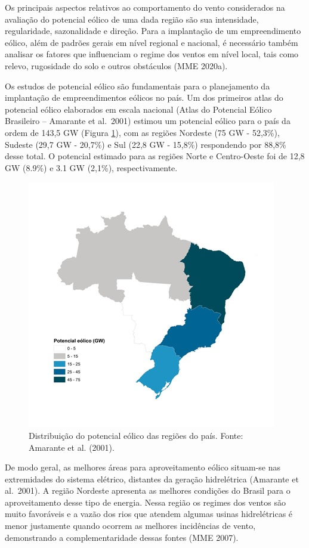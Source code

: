 \documentclass[
  oneside]{scrbook}
\begin{document}
Os principais aspectos relativos ao comportamento do vento considerados na avaliação do potencial eólico de uma dada região são sua intensidade, regularidade, sazonalidade e direção. Para a implantação de um empreendimento eólico, além de padrões gerais em nível regional e nacional, é necessário também analisar os fatores que influenciam o regime dos ventos em nível local, tais como relevo, rugosidade do solo e outros obstáculos (MME 2020a).

Os estudos de potencial eólico são fundamentais para o planejamento da implantação de empreendimentos eólicos no país. Um dos primeiros atlas do potencial eólico elaborados em escala nacional (Atlas do Potencial Eólico Brasileiro -- Amarante et al.~2001) estimou um potencial eólico para o país da ordem de 143,5 GW (Figura \ref{fig:02}), com as regiões Nordeste (75 GW - 52,3\%), Sudeste (29,7 GW - 20,7\%) e Sul (22,8 GW - 15,8\%) respondendo por 88,8\% desse total. O potencial estimado para as regiões Norte e Centro-Oeste foi de 12,8 GW (8.9\%) e 3.1 GW (2,1\%), respectivamente.

\begin{figure}[H]

{\centering \includegraphics[width=0.55\linewidth]{imagens/cap01/Figura_1.2} 

}

\caption{Distribuição do potencial eólico das regiões do país. Fonte: Amarante et al. (2001).}\label{fig:02}
\end{figure}

De modo geral, as melhores áreas para aproveitamento eólico situam-se nas extremidades do sistema elétrico, distantes da geração hidrelétrica (Amarante et al.~2001). A região Nordeste apresenta as melhores condições do Brasil para o aproveitamento desse tipo de energia. Nessa região os regimes dos ventos são muito favoráveis e a vazão dos rios que atendem algumas usinas hidrelétricas é menor justamente quando ocorrem as melhores incidências de vento, demonstrando a complementaridade dessas fontes (MME 2007).
\end{document}

